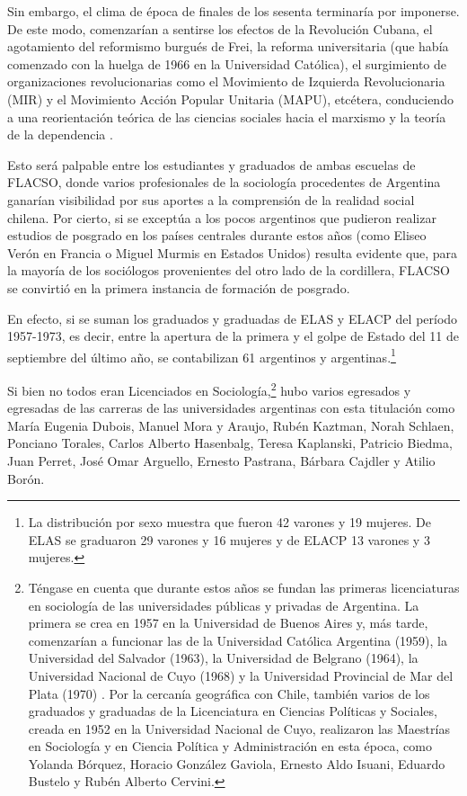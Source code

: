 Sin embargo, el clima de época de finales de los sesenta terminaría por imponerse. De este modo, comenzarían a sentirse los efectos de la Revolución Cubana, el agotamiento del reformismo burgués de Frei, la reforma universitaria (que había comenzado con la huelga de 1966 en la Universidad Católica), el surgimiento de organizaciones revolucionarias como el Movimiento de Izquierda Revolucionaria (MIR) y el Movimiento Acción Popular Unitaria (MAPU), etcétera, conduciendo a una reorientación teórica de las ciencias sociales hacia el marxismo y la teoría de la dependencia \parencite{1452-VASCONI1995}.

Esto será palpable entre los estudiantes y graduados de ambas escuelas de FLACSO, donde varios profesionales de la sociología procedentes de Argentina ganarían visibilidad por sus aportes a la comprensión de la realidad social chilena. Por cierto, si se exceptúa a los pocos argentinos que pudieron realizar estudios de posgrado en los países centrales durante estos años (como Eliseo Verón en Francia o Miguel Murmis en Estados Unidos) resulta evidente que, para la mayoría de los sociólogos provenientes del otro lado de la cordillera, FLACSO se convirtió en la primera instancia de formación de posgrado.

En efecto, si se suman los graduados y graduadas de ELAS y ELACP del período 1957-1973, es decir, entre la apertura de la primera y el golpe de Estado del 11 de septiembre del último año, se contabilizan 61 argentinos y argentinas.\footnote{La distribución por sexo muestra que fueron 42 varones y 19 mujeres. De ELAS se graduaron 29 varones y 16 mujeres y de ELACP 13 varones y 3 mujeres.}

Si bien no todos eran Licenciados en Sociología,\footnote{Téngase en cuenta que durante estos años se fundan las primeras licenciaturas en sociología de las universidades públicas y privadas de Argentina. La primera se crea en 1957 en la Universidad de Buenos Aires y, más tarde, comenzarían a funcionar las de la Universidad Católica Argentina (1959), la Universidad del Salvador (1963), la Universidad de Belgrano (1964), la Universidad Nacional de Cuyo (1968) y la Universidad Provincial de Mar del Plata (1970) \parencite{1616-DIAZ2016,1622-FICCARDI2013,1662-GARAVENTA2016,1663-PEREYRA2012}. Por la cercanía geográfica con Chile, también varios de los graduados y graduadas de la Licenciatura en Ciencias Políticas y Sociales, creada en 1952 en la Universidad Nacional de Cuyo, realizaron las Maestrías en Sociología y en Ciencia Política y Administración en esta época, como Yolanda Bórquez, Horacio González Gaviola, Ernesto Aldo Isuani, Eduardo Bustelo y Rubén Alberto Cervini.} hubo varios egresados y egresadas de las carreras de las universidades argentinas con esta titulación como María Eugenia Dubois, Manuel Mora y Araujo, Rubén Kaztman, Norah Schlaen, Ponciano Torales, Carlos Alberto Hasenbalg, Teresa Kaplanski, Patricio Biedma, Juan Perret, José Omar Arguello, Ernesto Pastrana, Bárbara Cajdler y Atilio Borón.


